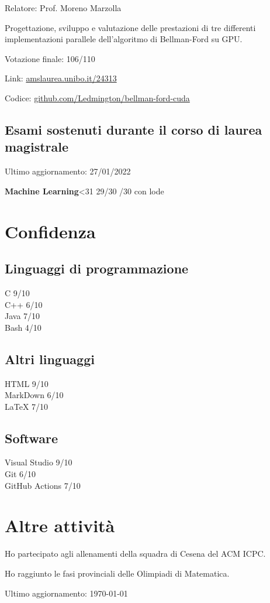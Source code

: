 \documentclass{article}
\newcommand{\years}[1]{\marginnote{\small #1}} %
\newcommand{\https}[1]{\href{https://#1}{#1}}
\newcommand{\exam}[2]{\textbf{#1}\hfill \ifnum #2<31 {\Large #2}/30 \else {\Large 30}/30 con lode \fi\\}
\newcommand{\skill}[2]{#1 #2/10}
\begin{document}
	Relatore: Prof. Moreno Marzolla
	
	Progettazione, sviluppo e valutazione delle prestazioni di tre differenti implementazioni parallele dell'algoritmo di Bellman-Ford su GPU.
	
	Votazione finale: 106/110
	
	Link: \https{amslaurea.unibo.it/24313}
	
	Codice: \https{github.com/Ledmington/bellman-ford-cuda}
	
	\subsection*{Esami sostenuti durante il corso di laurea magistrale}
	{\small Ultimo aggiornamento: 27/01/2022}
	\medskip
	
	\begin{minipage}[t]{.47\textwidth}
		\exam{Machine Learning}{29}
	\end{minipage}
	\hfill
	\begin{minipage}[t]{.47\textwidth}
	\end{minipage}
	
	\section*{Confidenza}
	\subsection*{Linguaggi di programmazione}
	\skill{C}{9}\\
	\skill{C++}{6}\\
	\skill{Java}{7}\\
	\skill{Bash}{4}
	
	\subsection*{Altri linguaggi}
	\skill{HTML}{9}\\
	\skill{MarkDown}{6}\\
	\skill{\LaTeX}{7}
	
	\subsection*{Software}
	\skill{Visual Studio}{9}\\
	\skill{Git}{6}\\
	\skill{GitHub Actions}{7}
	
	\section*{Altre attività}
	\years{2018} Ho partecipato agli allenamenti della squadra di Cesena del ACM ICPC.
	
	\years{2014} Ho raggiunto le fasi provinciali delle Olimpiadi di Matematica.
	
	\vfill
	\begin{center}
		\scriptsize
		Ultimo aggiornamento: \today
	\end{center}
	
\end{document}
